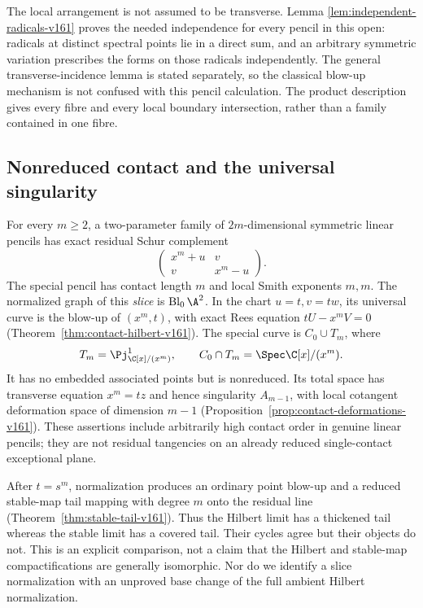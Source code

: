 The local arrangement is not assumed to be transverse. Lemma
\ref{lem:independent-radicals-v161} proves the needed independence
for every pencil in this open: radicals at distinct spectral points
lie in a direct sum, and an arbitrary symmetric variation prescribes
the forms on those radicals independently. The general
transverse-incidence lemma is stated separately, so the classical
blow-up mechanism is not confused with this pencil calculation.
The product description gives every fibre and every local boundary
intersection, rather than a family contained in one fibre.

\subsection{Nonreduced contact and the universal singularity}
For every $m\geq2$, a two-parameter family of $2m$-dimensional
symmetric linear pencils has exact residual Schur complement
\[
 \begin{pmatrix}x^m+u&v\\v&x^m-u\end{pmatrix}.
\]
The special pencil has contact length $m$ and local Smith exponents
$m,m$. The normalized graph of this \emph{slice} is
$\operatorname{Bl}_0\A^2$. In the chart $u=t,v=tw$, its universal
curve is the blow-up of $(x^m,t)$, with exact Rees equation
$tU-x^mV=0$ (Theorem~\ref{thm:contact-hilbert-v161}). The special
curve is $C_0\cup T_m$, where
\[
 T_m=\Pj^1_{\C[x]/(x^m)},\qquad
 C_0\cap T_m=\Spec\C[x]/(x^m).
\]
It has no embedded associated points but is nonreduced. Its total
space has transverse equation $x^m=tz$ and hence singularity
$A_{m-1}$, with local cotangent deformation space of dimension
$m-1$ (Proposition~\ref{prop:contact-deformations-v161}).
These assertions include arbitrarily high contact order in genuine
linear pencils; they are not residual tangencies on an already
reduced single-contact exceptional plane.

After $t=s^m$, normalization produces an ordinary point blow-up and
a reduced stable-map tail mapping with degree $m$ onto the residual
line (Theorem~\ref{thm:stable-tail-v161}). Thus the Hilbert limit
has a thickened tail whereas the stable limit has a covered tail.
Their cycles agree but their objects do not. This is an explicit
comparison, not a claim that the Hilbert and stable-map
compactifications are generally isomorphic. Nor do we identify a
slice normalization with an unproved base change of the full
ambient Hilbert normalization.

